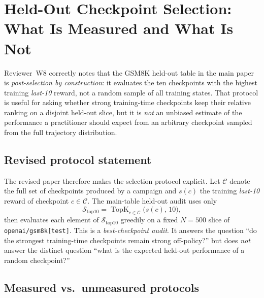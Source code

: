 \section{Held-Out Checkpoint Selection: What Is Measured and What Is Not}
\label{sec:heldout-stratified}

Reviewer~W8 correctly notes that the GSM8K held-out table in the main paper
is \emph{post-selection by construction}: it evaluates the ten checkpoints
with the highest training \emph{last-10} reward, not a random sample of all
training states. That protocol is useful for asking whether strong
training-time checkpoints keep their relative ranking on a disjoint held-out
slice, but it is \emph{not} an unbiased estimate of the performance a
practitioner should expect from an arbitrary checkpoint sampled from the full
trajectory distribution.

\subsection{Revised protocol statement}

The revised paper therefore makes the selection protocol explicit. Let
$\mathcal{C}$ denote the full set of checkpoints produced by a campaign and
$s(c)$ the training \emph{last-10} reward of checkpoint $c \in \mathcal{C}$.
The main-table held-out audit uses only
\[
\mathcal{S}_{\text{top10}} = \operatorname{TopK}_{c \in \mathcal{C}}\bigl(s(c),\,10\bigr),
\]
then evaluates each element of $\mathcal{S}_{\text{top10}}$ greedily on a
fixed $N=500$ slice of \texttt{openai/gsm8k[test]}. This is a
\emph{best-checkpoint audit}. It answers the question
``do the strongest training-time checkpoints remain strong off-policy?''
but does \emph{not} answer the distinct question
``what is the expected held-out performance of a random checkpoint?''

\subsection{Measured vs.\ unmeasured protocols}

